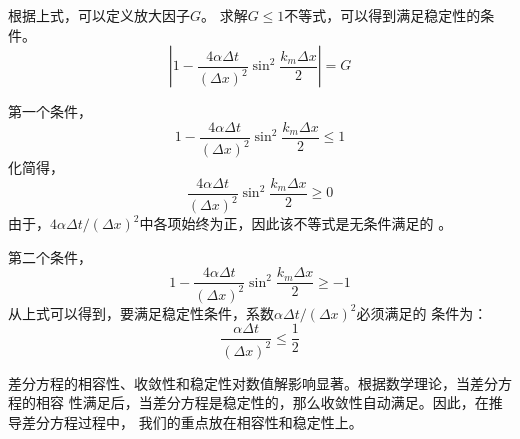 根据上式，可以定义放大因子$G$。
求解$G\le 1$不等式，可以得到满足稳定性的条件。
\begin{equation}
\left|
1
-
\frac{4\alpha \Delta t}{(\Delta x)^{2}}
\sin^{2}\frac{k_{m}\Delta x}{2}
\right|
=
G
\end{equation}

第一个条件，
\begin{equation}
1
-
\frac{4\alpha \Delta t}{(\Delta x)^{2}}
\sin^{2}\frac{k_{m}\Delta x}{2}
\le 1
\end{equation}
化简得，
\begin{equation}
\frac{4\alpha \Delta t}{(\Delta x)^{2}}
\sin^{2}\frac{k_{m}\Delta x}{2}
\ge
0
\end{equation}
由于，$4\alpha\Delta t/(\Delta x)^{2}$中各项始终为正，因此该不等式是无条件满足的
。

第二个条件，
\begin{equation}
1
-
\frac{4\alpha \Delta t}{(\Delta x)^{2}}
\sin^{2}\frac{k_{m}\Delta x}{2}
\ge -1
\end{equation}
从上式可以得到，要满足稳定性条件，系数$\alpha\Delta t/(\Delta x)^{2}$必须满足的
条件为：
\begin{equation}
\frac{\alpha \Delta t}{(\Delta x)^{2}}
\le
\frac{1}{2}
\end{equation}

差分方程的相容性、收敛性和稳定性对数值解影响显著。根据数学理论，当差分方程的相容
性满足后，当差分方程是稳定性的，那么收敛性自动满足。因此，在推导差分方程过程中，
我们的重点放在相容性和稳定性上。
